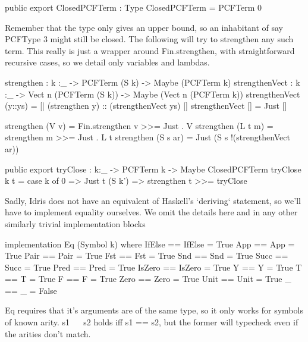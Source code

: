 \begin{code}
public export
ClosedPCFTerm : Type
ClosedPCFTerm = PCFTerm 0
\end{code}



Remember that the type only gives an upper bound, so an inhabitant of say PCFType 3 might still
be closed. The following will try to strengthen any such term.
This really is just a wrapper around Fin.strengthen, with straightforward recursive cases, so we
detail only variables and lambdas.

\begin{code}
strengthen : {k :_} -> PCFTerm (S k) -> Maybe (PCFTerm k)
strengthenVect : {k :_} -> Vect n (PCFTerm (S k)) -> Maybe (Vect n (PCFTerm k))
strengthenVect (y::ys) = [| (strengthen y) :: (strengthenVect ys) |]
strengthenVect [] = Just []
\end{code}

\begin{code}
strengthen (V v)    = Fin.strengthen v >>= Just . V
strengthen (L t m)  = strengthen m     >>= Just . L t
strengthen (S s ar) = Just (S s !(strengthenVect ar))
\end{code}

\begin{code}
public export
tryClose : {k:_} -> PCFTerm k -> Maybe ClosedPCFTerm
tryClose {k} t = case k of
                 0      => Just t
                 (S k') => strengthen t >>= tryClose
\end{code}

Sadly, Idris does not have an equivalent of Haskell's `deriving` statement, so we'll have to
implement equality ourselves. We omit the details here and in any other similarly trivial
implementation blocks

\begin{hidden}
implementation Eq (Symbol k) where
  IfElse == IfElse = True
  App    == App    = True
  Pair   == Pair   = True
  Fst    == Fst    = True
  Snd    == Snd    = True
  Succ   == Succ   = True
  Pred   == Pred   = True
  IsZero == IsZero = True
  Y      == Y      = True
  T      == T      = True
  F      == F      = True
  Zero   == Zero   = True
  Unit   == Unit   = True
  _      == _      = False
\end{hidden}

Eq requires that it's arguments are of the same type, so it only works for symbols of known arity.
s1 ~~ s2 holds iff s1 == s2, but the former will typecheck even if the arities don't match.

